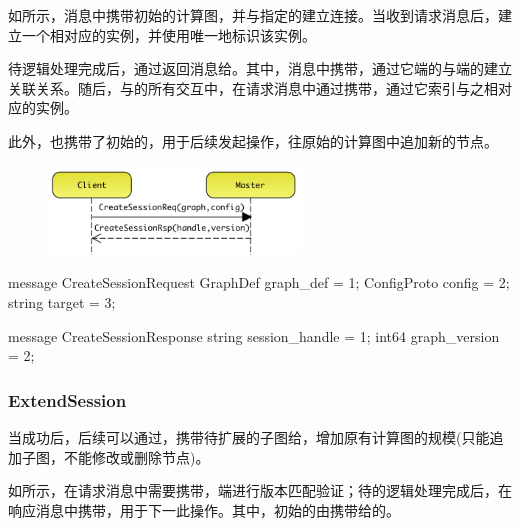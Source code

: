 \begin{content}
如所示，消息中携带初始的计算图，并与指定的建立连接。当收到请求消息后，建立一个相对应的实例，并使用唯一地标识该实例。

待逻辑处理完成后，通过返回消息给。其中，消息中携带，通过它端的与端的建立关联关系。随后，与的所有交互中，在请求消息中通过携带，通过它索引与之相对应的实例。

此外，也携带了初始的，用于后续发起操作，往原始的计算图中追加新的节点。

\begin{figure}[H]
\centering
\includegraphics[width=0.6\textwidth]{figures/dist-ms-create-sess-req.png}
\caption{}
 \label{fig:dist-ms-create-sess-req}
\end{figure}

\begin{leftbar}
\begin{c++}
message CreateSessionRequest {
  GraphDef graph_def = 1;
  ConfigProto config = 2;
  string target = 3;
}

message CreateSessionResponse {
  string session_handle = 1;
  int64 graph_version = 2;
}
\end{c++}
\end{leftbar}

\subsubsection{ExtendSession}

当成功后，后续可以通过，携带待扩展的子图给，增加原有计算图的规模(只能追加子图，不能修改或删除节点)。

如所示，在请求消息中需要携带，端进行版本匹配验证；待的逻辑处理完成后，在响应消息中携带，用于下一此操作。其中，初始的由携带给的。


\end{content}
